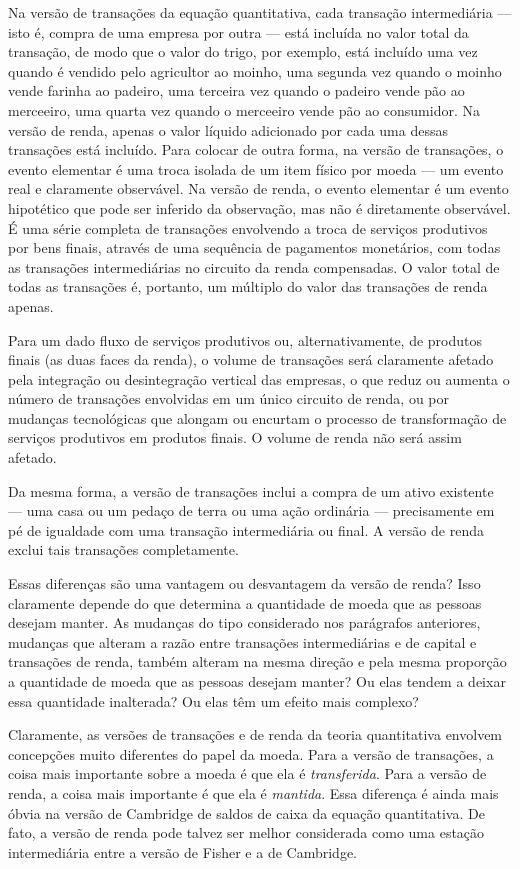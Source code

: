 \documentclass[12pt]{article}
\begin{document}
Na versão de transações da equação quantitativa, cada transação intermediária — isto é, compra de uma empresa por outra — está incluída no valor total da transação, de modo que o valor do trigo, por exemplo, está incluído uma vez quando é vendido pelo agricultor ao moinho, uma segunda vez quando o moinho vende farinha ao padeiro, uma terceira vez quando o padeiro vende pão ao merceeiro, uma quarta vez quando o merceeiro vende pão ao consumidor. Na versão de renda, apenas o valor líquido adicionado por cada uma dessas transações está incluído. Para colocar de outra forma, na versão de transações, o evento elementar é uma troca isolada de um item físico por moeda — um evento real e claramente observável. Na versão de renda, o evento elementar é um evento hipotético que pode ser inferido da observação, mas não é diretamente observável. É uma série completa de transações envolvendo a troca de serviços produtivos por bens finais, através de uma sequência de pagamentos monetários, com todas as transações intermediárias no circuito da renda compensadas. O valor total de todas as transações é, portanto, um múltiplo do valor das transações de renda apenas.

Para um dado fluxo de serviços produtivos ou, alternativamente, de produtos finais (as duas faces da renda), o volume de transações será claramente afetado pela integração ou desintegração vertical das empresas, o que reduz ou aumenta o número de transações envolvidas em um único circuito de renda, ou por mudanças tecnológicas que alongam ou encurtam o processo de transformação de serviços produtivos em produtos finais. O volume de renda não será assim afetado.

Da mesma forma, a versão de transações inclui a compra de um ativo existente — uma casa ou um pedaço de terra ou uma ação ordinária — precisamente em pé de igualdade com uma transação intermediária ou final. A versão de renda exclui tais transações completamente.

Essas diferenças são uma vantagem ou desvantagem da versão de renda? Isso claramente depende do que determina a quantidade de moeda que as pessoas desejam manter. As mudanças do tipo considerado nos parágrafos anteriores, mudanças que alteram a razão entre transações intermediárias e de capital e transações de renda, também alteram na mesma direção e pela mesma proporção a quantidade de moeda que as pessoas desejam manter? Ou elas tendem a deixar essa quantidade inalterada? Ou elas têm um efeito mais complexo?

Claramente, as versões de transações e de renda da teoria quantitativa envolvem concepções muito diferentes do papel da moeda. Para a versão de transações, a coisa mais importante sobre a moeda é que ela é \textit{transferida}. Para a versão de renda, a coisa mais importante é que ela é \textit{mantida}. Essa diferença é ainda mais óbvia na versão de Cambridge de saldos de caixa da equação quantitativa. De fato, a versão de renda pode talvez ser melhor considerada como uma estação intermediária entre a versão de Fisher e a de Cambridge.
\end{document}
